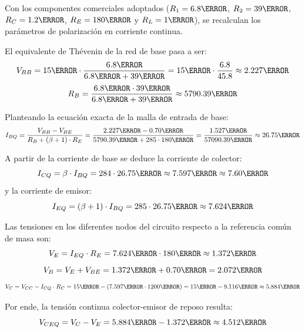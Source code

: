 Con los componentes comerciales adoptados ($R_1 = 6.8\kohm$, $R_2 = 39\kohm$, $R_C = 1.2\kohm$, $R_E = 180\ohm$ y
$R_L = 1\kohm$), se recalculan los parámetros de polarización en corriente continua.

El equivalente de Thévenin de la red de base pasa a ser:
\begin{equation}
  V_{BB} = 15\V \cdot \frac{6.8\kohm}{6.8\kohm + 39\kohm} = 15\V \cdot \frac{6.8}{45.8} \approx 2.227\V
  \label{eq:Vbb_norm}
\end{equation}
\begin{equation}
  R_B = \frac{6.8\kohm \cdot 39\kohm}{6.8\kohm + 39\kohm} \approx 5790.39\ohm
  \label{eq:Rb_norm}
\end{equation}

Planteando la ecuación exacta de la malla de entrada de base:
\begin{equation}
  I_{BQ} = \frac{V_{BB} - V_{BE}}{R_B + (\beta + 1) \cdot R_E} = \frac{2.227\V - 0.70\V}{5790.39\ohm + 285 \cdot 180\ohm} = \frac{1.527\V}{57090.39\ohm} \approx 26.75\uA
  \label{eq:Ibq_norm}
\end{equation}

A partir de la corriente de base se deduce la corriente de colector:
\begin{equation}
  I_{CQ} = \beta \cdot I_{BQ} = 284 \cdot 26.75\uA \approx 7.597\mA \approx 7.60\mA
  \label{eq:Icq_norm}
\end{equation}
y la corriente de emisor:
\begin{equation}
  I_{EQ} = (\beta + 1) \cdot I_{BQ} = 285 \cdot 26.75\uA \approx 7.624\mA
\end{equation}

Las tensiones en los diferentes nodos del circuito respecto a la referencia común de masa son:
\begin{equation}
  V_E = I_{EQ} \cdot R_E = 7.624\mA \cdot 180\ohm \approx 1.372\V
\end{equation}
\begin{equation}
  V_B = V_E + V_{BE} = 1.372\V + 0.70\V = 2.072\V
\end{equation}
\begin{equation}
  V_C = V_{CC} - I_{CQ} \cdot R_C = 15\V - (7.597\mA \cdot 1200\ohm) = 15\V - 9.116\V \approx 5.884\V
\end{equation}

Por ende, la tensión continua colector-emisor de reposo resulta:
\begin{equation}
  V_{CEQ} = V_C - V_E = 5.884\V - 1.372\V \approx 4.512\V
  \label{eq:Vceq_norm}
\end{equation}

